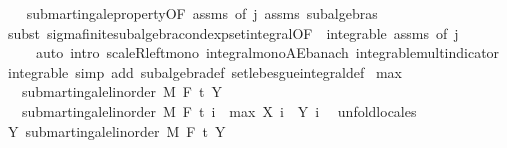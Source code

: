 \begin{isabellebody}
%
\isadelimproof
\ \ %
\endisadelimproof
%
\isatagproof
{}\isamarkupfalse%
\ submartingale{\isacharunderscore}{\kern0pt}property{\isacharbrackleft}{\kern0pt}OF\ assms{\isacharparenleft}{\kern0pt}{}{\isacharparenright}{\kern0pt}{\isacharcomma}{\kern0pt}\ of\ j{\isacharbrackright}{\kern0pt}\ assms\ subalgebras\isanewline
\ \ \isamarkupfalse%
\ {\isacharparenleft}{\kern0pt}subst\ sigma{\isacharunderscore}{\kern0pt}finite{\isacharunderscore}{\kern0pt}subalgebra{\isachardot}{\kern0pt}cond{\isacharunderscore}{\kern0pt}exp{\isacharunderscore}{\kern0pt}set{\isacharunderscore}{\kern0pt}integral{\isacharbrackleft}{\kern0pt}OF\ {\isacharunderscore}{\kern0pt}\ integrable\ assms{\isacharparenleft}{\kern0pt}{}{\isacharparenright}{\kern0pt}{\isacharcomma}{\kern0pt}\ of\ j{\isacharbrackright}{\kern0pt}{\isacharparenright}{\kern0pt}\isanewline
\ \ \ \ \ {\isacharparenleft}{\kern0pt}auto\ intro{\isacharbang}{\kern0pt}{\isacharcolon}{\kern0pt}\ scaleR{\isacharunderscore}{\kern0pt}left{\isacharunderscore}{\kern0pt}mono\ integral{\isacharunderscore}{\kern0pt}mono{\isacharunderscore}{\kern0pt}AE{\isacharunderscore}{\kern0pt}banach\ integrable{\isacharunderscore}{\kern0pt}mult{\isacharunderscore}{\kern0pt}indicator\ integrable\ simp\ add{\isacharcolon}{\kern0pt}\ subalgebra{\isacharunderscore}{\kern0pt}def\ set{\isacharunderscore}{\kern0pt}lebesgue{\isacharunderscore}{\kern0pt}integral{\isacharunderscore}{\kern0pt}def{\isacharparenright}{\kern0pt}%
\endisatagproof
{\isafoldproof}%
%
\isadelimproof
\isanewline
%
\endisadelimproof
\isanewline
{}\isamarkupfalse%
\ max{\isacharcolon}{\kern0pt}\isanewline
\ \ \ {\isachardoublequoteopen}submartingale{\isacharunderscore}{\kern0pt}linorder\ M\ F\ t\ Y{\isachardoublequoteclose}\isanewline
\ \ \ {\isachardoublequoteopen}submartingale{\isacharunderscore}{\kern0pt}linorder\ M\ F\ t\ {\isacharparenleft}{\kern0pt}{\isasymlambda}i\ {\isasymxi}{\isachardot}{\kern0pt}\ max\ {\isacharparenleft}{\kern0pt}X\ i\ {\isasymxi}{\isacharparenright}{\kern0pt}\ {\isacharparenleft}{\kern0pt}Y\ i\ {\isasymxi}{\isacharparenright}{\kern0pt}{\isacharparenright}{\kern0pt}{\isachardoublequoteclose}\isanewline
%
\isadelimproof
%
\endisadelimproof
%
\isatagproof
{}\isamarkupfalse%
\ {\isacharparenleft}{\kern0pt}unfold{\isacharunderscore}{\kern0pt}locales{\isacharparenright}{\kern0pt}\isanewline
\ \ \isamarkupfalse%
\ Y{\isacharcolon}{\kern0pt}\ submartingale{\isacharunderscore}{\kern0pt}linorder\ M\ F\ t\ Y\ \isamarkupfalse%

\end{isabellebody}
